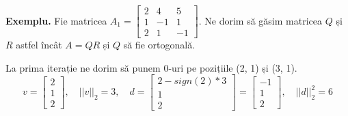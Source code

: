 \documentclass{exam}
\begin{document}
\textbf{Exemplu.} Fie matricea $A_1 = \begin{bmatrix} 2 & 4 & 5 \\ 1 & -1 & 1 \\ 2 & 1 & -1 \end{bmatrix}$.
Ne dorim să găsim matricea $Q$ și $R$ astfel încât $A = QR$ și $Q$ să fie ortogonală.

La prima iterație ne dorim să punem 0-uri pe pozițiile (2, 1) și (3, 1).
\begin{equation*}
	v = \begin{bmatrix} 2 \\ 1 \\ 2 \end{bmatrix}, \quad ||v||_2 = 3, \quad d = \begin{bmatrix} 2 -sign(2) * 3 \\ 1 \\ 2 \end{bmatrix} = \begin{bmatrix} -1 \\ 1 \\ 2 \end{bmatrix}, \quad ||d||_2^2 = 6
\end{equation*}
\end{document}
